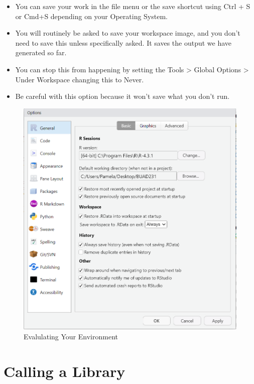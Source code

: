 \documentclass[
  letterpaper,
  DIV=11,
  numbers=noendperiod]{scrreprt}
\providecommand{\tightlist}{%
  \setlength{\itemsep}{0pt}\setlength{\parskip}{0pt}}\usepackage{longtable,booktabs,array}
\begin{document}
\begin{itemize}
\tightlist
\item
  You can save your work in the file menu or the save shortcut using
  Ctrl + S or Cmd+S depending on your Operating System.
\item
  You will routinely be asked to save your workspace image, and you
  don't need to save this unless specifically asked. It saves the output
  we have generated so far.
\item
  You can stop this from happening by setting the Tools \textgreater{}
  Global Options \textgreater{} Under Workspace changing this to Never.
\item
  Be careful with this option because it won't save what you don't run.
\end{itemize}

\begin{figure}[H]

{\centering \includegraphics{Pictures/Ch1/SaveOptions.png}

}

\caption{Evalulating Your Environment}

\end{figure}%

\section{Calling a Library}\label{calling-a-library}
\end{document}
